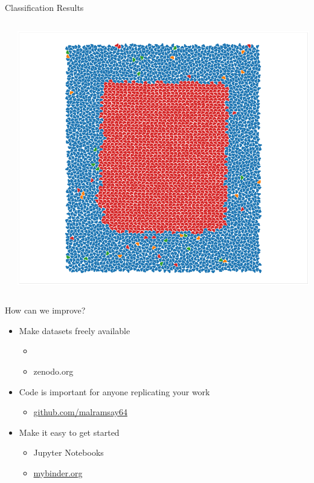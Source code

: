 \documentclass[aspectratio=169, 14pt]{beamer}
\begin{document}
\begin{frame}{Classification Results}
\begin{columns}
\begin{column}{0.33\textwidth}
    \end{column}
    \begin{column}{0.33\textwidth}
      \includegraphics[width=\textwidth]{classification_results_pg.png}
    \end{column}
  \end{columns}
\end{frame}


\begin{frame}{How can we improve?}

  \begin{itemize}
    \item Make datasets freely available
      \begin{itemize}
        \item \item{zenodo.org}
      \end{itemize}
    \item Code is important for anyone replicating your work
      \begin{itemize}
        \item \url{github.com/malramsay64}
      \end{itemize}
    \item Make it easy to get started
      \begin{itemize}
        \item Jupyter Notebooks
        \item \url{mybinder.org}
      \end{itemize}
  \end{itemize}

\end{frame}
\end{document}
